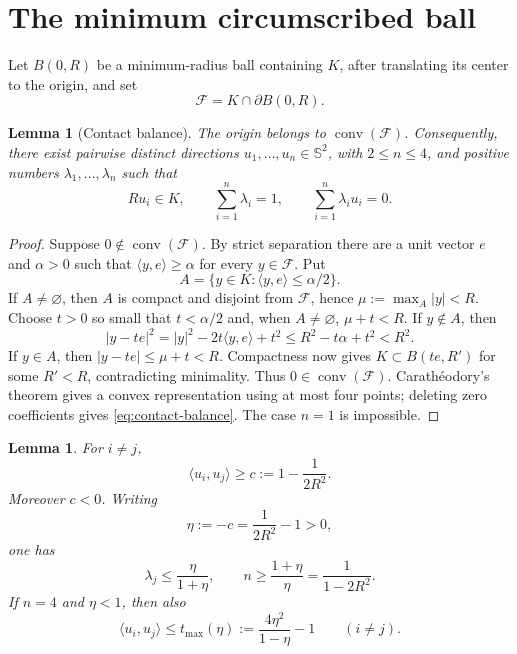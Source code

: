 \documentclass[11pt,reqno]{amsart}
\numberwithin{equation}{section}
\newtheorem{lemma}[theorem]{Lemma}
\theoremstyle{definition}
\theoremstyle{remark}
\newcommand{\Sph}{\mathbb{S}^{2}}
\newcommand{\conv}{\operatorname{conv}}
\newcommand{\ip}[2]{\langle #1,#2\rangle}
\begin{document}
\section{The minimum circumscribed ball}\label{sec:circumsphere}

Let $B(0,R)$ be a minimum-radius ball containing $K$, after translating its center to the origin, and set
\[
 \mathcal F=K\cap \partial B(0,R).
\]

\begin{lemma}[Contact balance]\label{lem:contact-balance}
The origin belongs to $\conv(\mathcal F)$. Consequently, there exist pairwise distinct directions $u_1,\dots,u_n\in\Sph$, with $2\leq n\leq4$, and positive numbers $\lambda_1,\dots,\lambda_n$ such that
\begin{equation}\label{eq:contact-balance}
 Ru_i\in K,
 \qquad
 \sum_{i=1}^{n}\lambda_i=1,
 \qquad
 \sum_{i=1}^{n}\lambda_i u_i=0.
\end{equation}
\end{lemma}

\begin{proof}
Suppose $0\notin\conv(\mathcal F)$. By strict separation there are a unit vector $e$ and $\alpha>0$ such that $\ip{y}{e}\geq\alpha$ for every $y\in\mathcal F$. Put
\[
 A=\{y\in K:\ip{y}{e}\leq\alpha/2\}.
\]
If $A\neq\varnothing$, then $A$ is compact and disjoint from $\mathcal F$, hence
$\mu:=\max_{A}|y|<R$. Choose $t>0$ so small that $t<\alpha/2$ and, when $A\neq\varnothing$, $\mu+t<R$. If $y\notin A$, then
\[
 |y-te|^{2}=|y|^{2}-2t\ip{y}{e}+t^{2}
 \leq R^{2}-t\alpha+t^{2}<R^{2}.
\]
If $y\in A$, then $|y-te|\leq\mu+t<R$. Compactness now gives $K\subset B(te,R')$ for some $R'<R$, contradicting minimality. Thus $0\in\conv(\mathcal F)$. Carath\'eodory's theorem gives a convex representation using at most four points; deleting zero coefficients gives \eqref{eq:contact-balance}. The case $n=1$ is impossible.
\end{proof}

\begin{lemma}\label{lem:contact-angle}
For $i\neq j$,
\begin{equation}\label{eq:contact-lower}
 \ip{u_i}{u_j}\geq c:=1-\frac{1}{2R^{2}}.
\end{equation}
Moreover $c<0$. Writing
\begin{equation}\label{eq:eta}
 \eta:=-c=\frac{1}{2R^{2}}-1>0,
\end{equation}
one has
\begin{equation}\label{eq:lambda-bound}
 \lambda_j\leq \frac{\eta}{1+\eta},
 \qquad
 n\geq \frac{1+\eta}{\eta}=\frac{1}{1-2R^{2}}.
\end{equation}
If $n=4$ and $\eta<1$, then also
\begin{equation}\label{eq:contact-upper}
 \ip{u_i}{u_j}\leq t_{\max}(\eta):=\frac{4\eta^{2}}{1-\eta}-1
 \qquad(i\neq j).
\end{equation}
\end{lemma}
\end{document}
